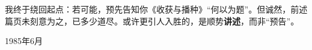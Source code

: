 我终于绕回起点：若可能，预先告知你《收获与播种》“何以为题”。但诚然，前述篇页未刻意为之，已多少道尽。或许更引人入胜的，是顺势\textbf{讲述}，而非“预告”。

\begin{flushright}
1985年6月
\end{flushright}
